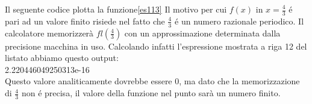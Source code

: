 Il seguente codice
%
plotta la funzione\ref{es113}
Il  motivo per cui $f(x)$ in $x=\frac{4}{3}$ \'e pari ad un valore finito risiede nel fatto che $\frac{4}{3}$ \'e un numero razionale periodico.
Il calcolatore memorizzerà $fl(\frac{4}{3})$ con un approssimazione determinata dalla precisione macchina in uso.
Calcolando infatti l'espressione mostrata a riga 12 del listato abbiamo questo output:\\   2.220446049250313e-16\\
Questo valore analiticamente dovrebbe essere 0, ma dato che la memorizzazione di $\frac{4}{3}$ non \'e precisa, il valore della funzione nel punto sarà un numero finito.
